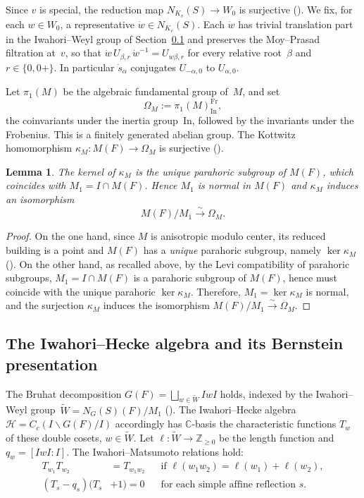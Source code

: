 \documentclass[11pt]{amsart}
\newtheorem{lemma}[theorem]{Lemma}
\theoremstyle{definition}
\theoremstyle{remark}
\newcommand{\CC}{\mathbb{C}}
\newcommand{\ZZ}{\mathbb{Z}}
\newcommand{\HH}{\mathcal{H}}
\begin{document}
Since $v$ is special, the reduction map $N_{K_v}(S) \to W_0$ is surjective (\cite[Prop.~9.9.1]{KP}). We fix, for each $w \in W_0$, a representative $\dot{w} \in N_{K_v}(S)$. Each $\dot{w}$ has trivial translation part in the Iwahori--Weyl group of Section~\ref{ssec:Hecke} and preserves the Moy--Prasad filtration at~$v$, so that $\dot{w}\,U_{\beta,r}\,\dot{w}^{-1} = U_{w\beta,r}$ for every relative root~$\beta$ and $r \in \{0, 0+\}$. In particular $\dot{s}_\alpha$ conjugates $U_{-\alpha,0}$ to $U_{\alpha,0}$.

Let $\pi_1(M)$ be the algebraic fundamental group of~$M$, and set
\[
\Omega_M := \pi_1(M)_{\mathrm{In}}^{\mathrm{Fr}},
\]
the coinvariants under the inertia group~$\mathrm{In}$, followed by the invariants under the Frobenius. This is a finitely generated abelian group. The Kottwitz homomorphism $\kappa_M: M(F) \to \Omega_{M}$ is surjective (\cite[Cor.~11.7.5]{KP}).

\begin{lemma}\label{lem:M1}
The kernel of $\kappa_M$ is the unique parahoric subgroup of $M(F)$, which coincides with $M_1 = I\cap M(F)$. Hence $M_1$ is normal in $M(F)$ and $\kappa_M$ induces an isomorphism
\[
M(F)/M_1 \xrightarrow{\ \sim\ } \Omega_M.
\]
\end{lemma}

\begin{proof}
On the one hand, since $M$ is anisotropic modulo center, its reduced building is a point and $M(F)$ has a \emph{unique} parahoric subgroup, namely $\ker\kappa_M$ (\cite[Prop.~11.5.4]{KP}). On the other hand, as recalled above, by the Levi compatibility of parahoric subgroups, $M_1 = I\cap M(F)$ is a parahoric subgroup of $M(F)$, hence must coincide with the unique parahoric $\ker\kappa_M$. Therefore, $M_1 = \ker\kappa_M$ is normal, and the surjection $\kappa_M$ induces the isomorphism $M(F)/M_1\xrightarrow{\ \sim\ }\Omega_M$.
\end{proof}

\subsection{The Iwahori--Hecke algebra and its Bernstein presentation}\label{ssec:Hecke}

The Bruhat decomposition $G(F) = \bigsqcup_{w\in\widetilde{W}} IwI$ holds, indexed by the Iwahori--Weyl group~$\widetilde{W} = N_G(S)(F)/M_1$ (\cite[Thm.~7.8.1]{KP}). The Iwahori--Hecke algebra $\HH = C_c(I\backslash G(F)/I)$ accordingly has $\CC$-basis the characteristic functions $T_w$ of these double cosets, $w \in \widetilde{W}$. Let $\ell \colon \widetilde{W} \to \ZZ_{\ge 0}$ be the length function and $q_w = [IwI:I]$. The Iwahori--Matsumoto relations hold:
\begin{align*}
T_{w_1}T_{w_2} &= T_{w_1 w_2} && \text{if } \ell(w_1 w_2) = \ell(w_1)+\ell(w_2),\\
(T_s - q_s)(T_s &+ 1) = 0 && \text{for each simple affine reflection } s.
\end{align*}
\end{document}
